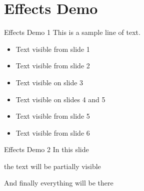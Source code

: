 \section{Effects Demo}
\begin{frame}{Effects Demo 1}
This is a sample line of text.

\begin{itemize}
 \item<1-> Text visible from slide 1 
 \item<2-> Text visible from slide 2
 \item<3> Text visible on slide 3
 \item<4-5> Text visible on slides 4 and 5
 \item<5-> Text visible from slide 5
 \item<6-> Text visible from slide 6
\end{itemize}
\end{frame}

\begin{frame}{Effects Demo 2}
 In this slide \pause

 the text will be partially visible \pause

 And finally everything will be there
\end{frame}